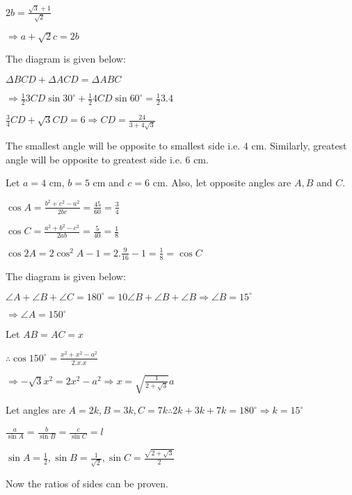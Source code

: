   $2b = \frac{\sqrt{3} + 1}{\sqrt{2}}$

  $\Rightarrow a + \sqrt{2}c = 2b$

\item The diagram is given below:

  \startplacefigure
    \externalfigure[18_2.pdf]
  \stopplacefigure

  $\Delta BCD + \Delta ACD = \Delta ABC$

  $\Rightarrow \frac{1}{2}3CD\sin30^\circ + \frac{1}{2}4CD\sin60^\circ = \frac{1}{2}3.4$

  $\frac{3}{4}CD + \sqrt{3}CD = 6 \Rightarrow CD = \frac{24}{3 + 4\sqrt{3}}$

\item The smallest angle will be opposite to smallest side i.e. $4$ cm. Similarly, greatest angle will be opposite to greatest
  side i.e. $6$ cm.

  Let $a = 4$ cm, $b = 5$ cm and $c = 6$ cm. Also, let opposite angles are $A, B$ and $C.$

  $\cos A = \frac{b^2 + c^2 - a^2}{2bc} = \frac{45}{60} = \frac{3}{4}$

  $\cos C = \frac{a^2 + b^2 - c^2}{2ab} = \frac{5}{40} = \frac{1}{8}$

  $\cos 2A = 2\cos^2A - 1 = 2.\frac{9}{16} - 1 = \frac{1}{8} = \cos C$

\item The diagram is given below:

  \startplacefigure
    \externalfigure[18_3.pdf]
  \stopplacefigure

  $\angle A + \angle B + \angle C = 180^\circ = 10\angle B + \angle B + \angle B \Rightarrow \angle B = 15^\circ$

  $\Rightarrow \angle A = 150^\circ$

  Let $AB = AC = x$

  $\therefore \cos 150^\circ = \frac{x^2 + x^2 - a^2}{2.x.x}$

  $\Rightarrow -\sqrt{3}x^2 = 2x^2 - a^2 \Rightarrow x = \sqrt{\frac{1}{2 + \sqrt{3}}}a$

\item Let angles are $A = 2k, B=3k, C=7k \therefore 2k + 3k + 7k = 180^\circ \Rightarrow k = 15^\circ$

  $\frac{a}{\sin A} = \frac{b}{\sin B} = \frac{c}{\sin C} = l$

  $\sin A = \frac{1}{2}, \sin B= \frac{1}{\sqrt{2}}, \sin C = \frac{\sqrt{2 + \sqrt{3}}}{2}$

  Now the ratios of sides can be proven.

